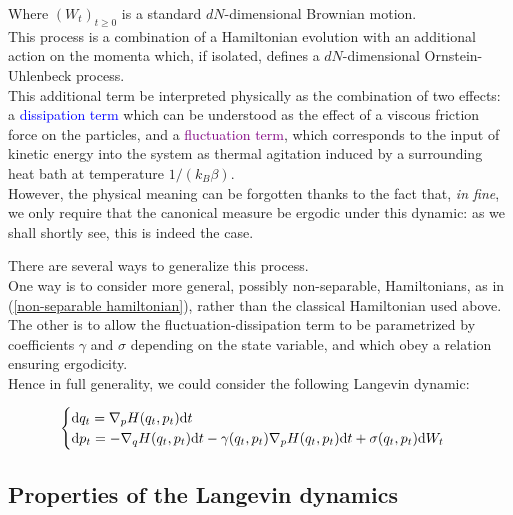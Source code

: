 Where $(W_t)_{t\geq 0}$ is a standard $dN$-dimensional Brownian motion.\\
This process is a combination of a Hamiltonian evolution with an additional action on the momenta which, if isolated, defines a $dN$-dimensional Ornstein-Uhlenbeck process.\\
This additional term be interpreted physically as the combination of two effects: a \textcolor{blue}{dissipation term} which can be understood as the effect of a viscous friction force on the particles, and a \textcolor{purple}{fluctuation term}, which corresponds to the input of kinetic energy into the system as thermal agitation induced by a surrounding heat bath at temperature $1/(k_B\beta)$.\\
However, the physical meaning can be forgotten thanks to the fact that, \textit{in fine}, we only require that the canonical measure be ergodic under this dynamic: as we shall shortly see, this is indeed the case.

\begin{remark}
    There are several ways to generalize this process.\\
    One way is to consider more general, possibly non-separable, Hamiltonians, as in (\ref{non-separable hamiltonian}), rather than the classical Hamiltonian used above.\\
    The other is to allow the fluctuation-dissipation term to be parametrized by coefficients $\gamma$ and $\sigma$ depending on the state variable, and which obey a relation ensuring ergodicity.\\
    Hence in full generality, we could consider the following Langevin dynamic:
    
    \begin{equation}
        \label{general Langevin}
        \begin{cases}
            \text dq_t=\nabla_p H(q_t,p_t)\text dt \\
            \text dp_t= -\nabla_q H(q_t,p_t)\text dt -\gamma(q_t,p_t)\nabla_pH(q_t,p_t)\text dt+\sigma(q_t,p_t)\text dW_t
        \end{cases}
    \end{equation}
\end{remark}



\subsection{Properties of the Langevin dynamics}

